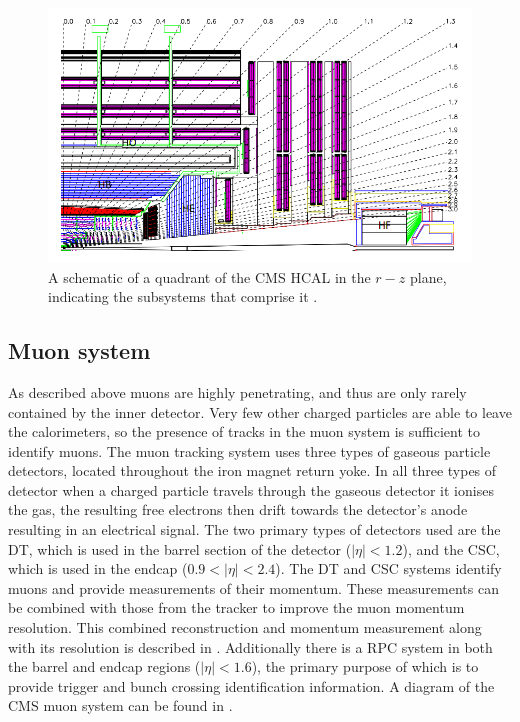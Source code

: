 \begin{figure}
  \includegraphics[width=1.2\largefigwidth]{plots/detector/hcal_layout1.png}
  \caption{A schematic of a quadrant of the CMS \ac{HCAL} in the $r-z$ plane, indicating the subsystems that comprise it \cite{Chatrchyan:2008aa}.}
  \label{fig:hcalschematic}
\end{figure}

\subsection{Muon system}
As described above muons are highly penetrating, and thus are only rarely contained by the inner detector. Very few other charged particles are able to leave the calorimeters, so the presence of tracks in the muon system is sufficient to identify muons. The muon tracking system uses three types of gaseous particle detectors, located throughout the iron magnet return yoke. In all three types of detector when a charged particle travels through the gaseous detector it ionises the gas, the resulting free electrons then drift towards the detector's anode resulting in an electrical signal. The two primary types of detectors used are the \ac{DT}, which is used in the barrel section of the detector ($|\eta|<1.2$), and the \ac{CSC}, which is used in the endcap ($0.9<|\eta|<2.4$). The \ac{DT} and \ac{CSC} systems identify muons and provide measurements of their momentum. These measurements can be combined with those from the tracker to improve the muon momentum resolution. This combined reconstruction and momentum measurement along with its resolution is described in . Additionally there is a \ac{RPC} system in both the barrel and endcap regions ($|\eta|<1.6$), the primary purpose of which is to provide trigger and bunch crossing identification information. A diagram of the CMS muon system can be found in .

